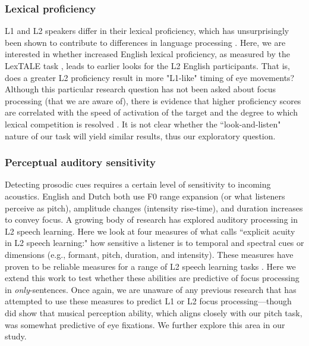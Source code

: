 \subsubsection{Lexical proficiency}
L1 and L2 speakers differ in their lexical proficiency, which has unsurprisingly been shown to contribute to differences in language processing \citep{Yap2012, zareva2005relationship}. Here, we are interested in whether increased English lexical proficiency, as measured by the LexTALE task \citep{lemhofer2012introducing}, leads to earlier looks for the L2 English participants. That is, does a greater L2 proficiency result in more "L1-like" timing of eye movements? Although this particular research question has not been asked about focus processing (that we are aware of), there is evidence that higher proficiency scores are correlated with the speed of activation of the target and the degree to which lexical competition is resolved \citep{sarrett2022within}. It is not clear whether the ``look-and-listen" nature of our task will yield similar results, thus our exploratory question.

 

\subsubsection{Perceptual auditory sensitivity}
Detecting prosodic cues requires a certain level of sensitivity to incoming acoustics. English and Dutch both use F0 range expansion (or what listeners perceive as pitch), amplitude changes (intensity rise-time), and duration increases to convey focus. A growing body of research has explored auditory processing in L2 speech learning. Here we look at four measures of what \cite{saito2023does} calls ``explicit acuity in L2 speech learning:" how sensitive a listener is to temporal and spectral cues or dimensions (e.g., formant,
pitch, duration, and intensity). These measures have proven to be reliable measures for a range of L2 speech learning tasks \citep{Kachlicka_Saito_Tierney_2019, saito2024auditory, bakkouche2025effects, bramlett_wiener_24_speechprosody}. Here we extend this work to test whether these abilities are predictive of focus processing in \textit{only}-sentences. Once again, we are unaware of any previous research that has attempted to use these measures to predict L1 or L2 focus processing---though \cite{jansen2023influence} did show that musical perception ability, which aligns closely with our pitch task, was somewhat predictive of eye fixations. We further explore this area in our study.


